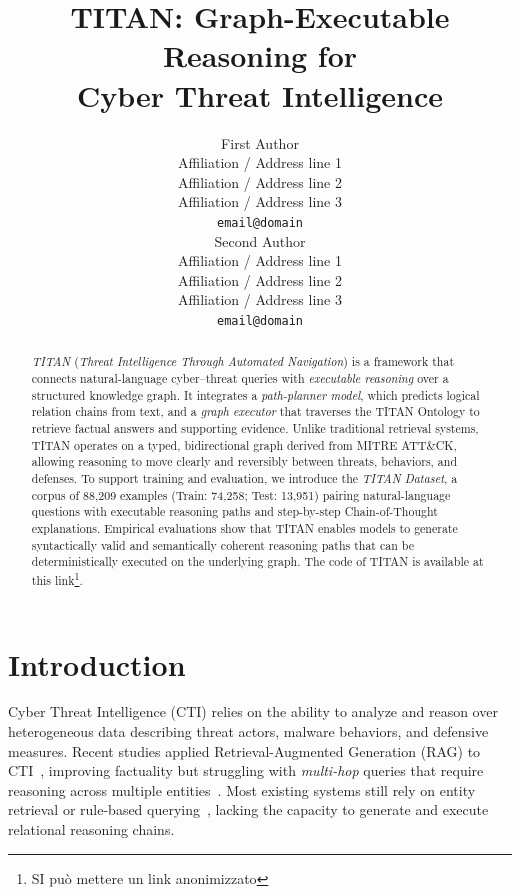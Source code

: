 \documentclass[11pt]{article}
\title{TITAN: Graph-Executable Reasoning for \\Cyber Threat Intelligence}
\author{First Author \\
  Affiliation / Address line 1 \\
  Affiliation / Address line 2 \\
  Affiliation / Address line 3 \\
  \texttt{email@domain} \\\And
  Second Author \\
  Affiliation / Address line 1 \\
  Affiliation / Address line 2 \\
  Affiliation / Address line 3 \\
  \texttt{email@domain} \\}
\begin{document}
%


\maketitle              %
%
\begin{abstract}

\textit{TITAN} (\textit{Threat Intelligence Through Automated Navigation}) is a framework that connects natural-language cyber–threat queries with \emph{executable reasoning} over a structured knowledge graph.  
It integrates a \textit{path-planner model}, which predicts logical relation chains from text, and a \textit{graph executor} that traverses the TITAN Ontology to retrieve factual answers and supporting evidence.  
Unlike traditional retrieval systems, TITAN operates on a typed, bidirectional graph derived from MITRE ATT\&CK, allowing reasoning to move clearly and reversibly between threats, behaviors, and defenses. To support training and evaluation, we introduce the \textit{TITAN Dataset}, a corpus of 88{,}209 examples (Train: 74{,}258; Test: 13{,}951) pairing natural-language questions with executable reasoning paths and step-by-step Chain-of-Thought explanations.  
Empirical evaluations show that TITAN enables models to generate syntactically valid and semantically coherent reasoning paths that can be deterministically executed on the underlying graph. The code of TITAN is available at this link\footnote{SI può mettere un link anonimizzato}.


\end{abstract}


\section{Introduction}

Cyber Threat Intelligence (CTI) relies on the ability to analyze and reason over heterogeneous data describing threat actors, malware behaviors, and defensive measures.  
Recent studies applied Retrieval-Augmented Generation (RAG) to CTI~\cite{fieblinger2024actionable,simoni2025morse}, improving factuality but struggling with \textit{multi-hop} queries that require reasoning across multiple entities~\cite{cyb_with_llm_rag}.  
Most existing systems still rely on entity retrieval or rule-based querying~\cite{MATRIX}, lacking the capacity to generate and execute relational reasoning chains.
\end{document}
